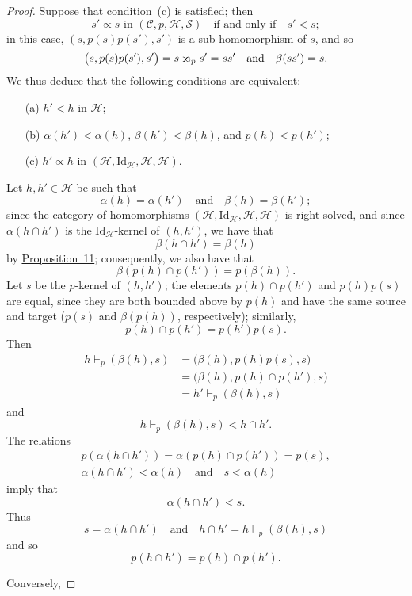 \documentclass[a4paper,oneside,nobib,nofonts,notitlepage,notoc,nols,fleqn,justified]{tufte-book}
\newcommand{\oldpage}[1]{{\reversemarginpar\marginnote{\raggedleft\footnotesize\textit{p.~#1}}}}
\newcommand{\CC}{\mathcal{C}}
\newcommand{\HH}{\mathcal{H}}
\renewcommand{\SS}{\mathcal{S}}
\newcommand{\subs}{\mathrel{\propto}}
\newcommand{\sups}{\mathrel{\reflectbox{$\propto$}}}
\newcommand{\Id}{\mathrm{Id}}
\begin{document}
\begin{proof}
  Suppose that condition~(c) is satisfied;
  then
  \[
    s'\subs s\text{ in }(\CC,p,\HH,\SS)
    \quad\text{if and only if}\quad
    s'<s;
  \]
  in this case, $(s,p(s)p(s'),s')$ is a sub-homomorphism of $s$, and so
  \[
    \big(
      s, p(s)p(s'), s'
    \big)
    = s\sups_p s'
    = ss'
    \quad\text{and}\quad
    \beta(ss')=s.
  \]
  We thus deduce that the following conditions are equivalent:
  \begin{enumerate}
    \item[\normalfont(a)]
      $h'<h$ in $\HH$;
    \item[\normalfont(b)]
      $\alpha(h')<\alpha(h)$, $\beta(h')<\beta(h)$, and $p(h)<p(h')$;
    \item[\normalfont(c)]
      $h'\subs h$ in $(\HH,\Id_\HH,\HH,\HH)$.
  \end{enumerate}
  Let $h,h'\in\HH$ be such that
  \[
    \alpha(h) = \alpha(h')
    \quad\text{and}\quad
    \beta(h) = \beta(h');
  \]
  since the category of homomorphisms $(\HH,\Id_\HH,\HH,\HH)$ is right solved, and since $\alpha(h\cap h')$ is the $\Id_\HH$-kernel of $(h,h')$, we have that
  \[
    \beta(h\cap h')
    = \beta(h)
  \]
  by \hyperref[proposition:11]{Proposition~11};
  consequently, we also have that
  \[
    \beta(p(h)\cap p(h'))
    = p(\beta(h)).
  \]
  Let $s$ be the $p$-kernel of $(h,h')$;
  the elements $p(h)\cap p(h')$ and $p(h)p(s)$ are equal, since they are both bounded above by $p(h)$ and have the same source and target ($p(s)$ and $\beta(p(h))$, respectively);
  similarly,
  \[
    p(h)\cap p(h')
    = p(h')p(s).
  \]
  Then
  \[
    \begin{aligned}
      h\vdash_p(\beta(h),s)
      &= \big(
        \beta(h), p(h)p(s), s
      \big)
    \\&= \big(
        \beta(h), p(h)\cap p(h'), s
      \big)
    \\&= h'\vdash_p(\beta(h),s)
    \end{aligned}
  \]
  and
  \[
    h\vdash_p(\beta(h),s)
    < h\cap h'.
  \]
  The relations
  \[
    \begin{gathered}
      p(\alpha(h\cap h'))
      = \alpha(p(h)\cap p(h'))
      = p(s),
    \\\alpha(h\cap h') < \alpha(h)
      \quad\text{and}\quad
      s < \alpha(h)
    \end{gathered}
  \]
  imply that
  \[
    \alpha(h\cap h')
    < s.
  \]
  Thus
  \[
    s = \alpha(h\cap h')
    \quad\text{and}\quad
    h\cap h' = h\vdash_p(\beta(h),s)
  \]
  and so
  \[
    p(h\cap h')
    = p(h)\cap p(h').
  \]

  \oldpage{372}
  Conversely,
\end{proof}





\nocite{*}
\begin{fullwidth}
  \printbibliography[heading=bibintoc,title=Bibliography]
\end{fullwidth}
\end{document}
